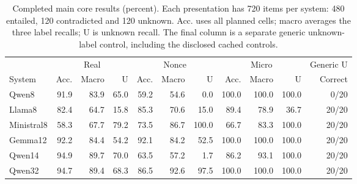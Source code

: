 \begin{table}[t]
\centering
\caption{Completed main core results (percent). Each presentation has 720 items per system: 480 entailed, 120 contradicted and 120 unknown. Acc. uses all planned cells; macro averages the three label recalls; U is unknown recall. The final column is a separate generic unknown-label control, including the disclosed cached controls. }
\label{tab:core_results}
\setlength{\tabcolsep}{4pt}
\begin{tabular}{lrrrrrrrrrr}
\toprule
 & \multicolumn{3}{c}{Real} & \multicolumn{3}{c}{Nonce} & \multicolumn{3}{c}{Micro} & Generic U\\
System & Acc. & Macro & U & Acc. & Macro & U & Acc. & Macro & U & Correct\\
\midrule
Qwen8 & 91.9 & 83.9 & 65.0 & 59.2 & 54.6 & 0.0 & 100.0 & 100.0 & 100.0 & 0/20 \\
Llama8 & 82.4 & 64.7 & 15.8 & 85.3 & 70.6 & 15.0 & 89.4 & 78.9 & 36.7 & 20/20 \\
Ministral8 & 58.3 & 67.7 & 79.2 & 73.5 & 86.7 & 100.0 & 66.7 & 83.3 & 100.0 & 20/20 \\
Gemma12 & 92.2 & 84.4 & 54.2 & 92.1 & 84.2 & 52.5 & 100.0 & 100.0 & 100.0 & 20/20 \\
Qwen14 & 94.9 & 89.7 & 70.0 & 63.5 & 57.2 & 1.7 & 86.2 & 93.1 & 100.0 & 20/20 \\
Qwen32 & 94.7 & 89.4 & 68.3 & 86.5 & 92.6 & 97.5 & 100.0 & 100.0 & 100.0 & 20/20 \\
\bottomrule
\end{tabular}
\end{table}
